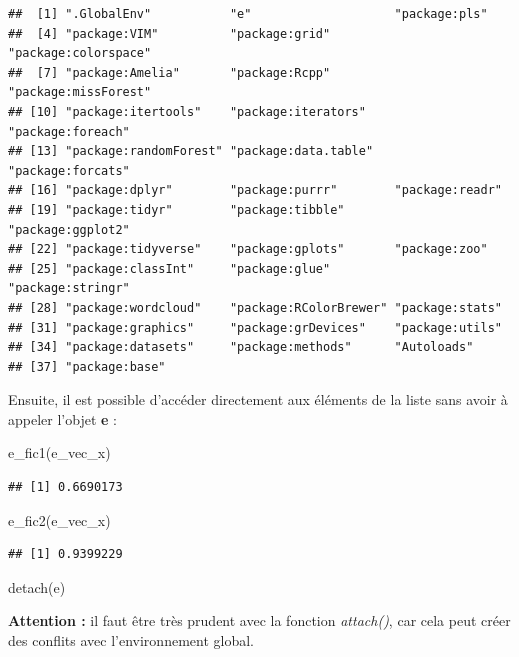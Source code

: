 \documentclass[
]{book}
\newenvironment{Shaded}{\begin{snugshade}}{\end{snugshade}}
\newcommand{\FunctionTok}[1]{\textcolor[rgb]{0.00,0.00,0.00}{#1}}
\newcommand{\NormalTok}[1]{#1}
\theoremstyle{definition}
\theoremstyle{definition}
\theoremstyle{definition}
\theoremstyle{definition}
\theoremstyle{remark}
\begin{document}
\begin{verbatim}
##  [1] ".GlobalEnv"           "e"                    "package:pls"         
##  [4] "package:VIM"          "package:grid"         "package:colorspace"  
##  [7] "package:Amelia"       "package:Rcpp"         "package:missForest"  
## [10] "package:itertools"    "package:iterators"    "package:foreach"     
## [13] "package:randomForest" "package:data.table"   "package:forcats"     
## [16] "package:dplyr"        "package:purrr"        "package:readr"       
## [19] "package:tidyr"        "package:tibble"       "package:ggplot2"     
## [22] "package:tidyverse"    "package:gplots"       "package:zoo"         
## [25] "package:classInt"     "package:glue"         "package:stringr"     
## [28] "package:wordcloud"    "package:RColorBrewer" "package:stats"       
## [31] "package:graphics"     "package:grDevices"    "package:utils"       
## [34] "package:datasets"     "package:methods"      "Autoloads"           
## [37] "package:base"
\end{verbatim}

Ensuite, il est possible d'accéder directement aux éléments de la liste sans avoir à appeler l'objet \textbf{e} :

\begin{Shaded}
\begin{Highlighting}[]
\FunctionTok{e\_fic1}\NormalTok{(e\_vec\_x)}
\end{Highlighting}
\end{Shaded}

\begin{verbatim}
## [1] 0.6690173
\end{verbatim}

\begin{Shaded}
\begin{Highlighting}[]
\FunctionTok{e\_fic2}\NormalTok{(e\_vec\_x)}
\end{Highlighting}
\end{Shaded}

\begin{verbatim}
## [1] 0.9399229
\end{verbatim}

\begin{Shaded}
\begin{Highlighting}[]
\FunctionTok{detach}\NormalTok{(e)}
\end{Highlighting}
\end{Shaded}

\textbf{Attention :} il faut être très prudent avec la fonction \emph{attach()}, car cela peut créer des conflits avec l'environnement global.
\end{document}
